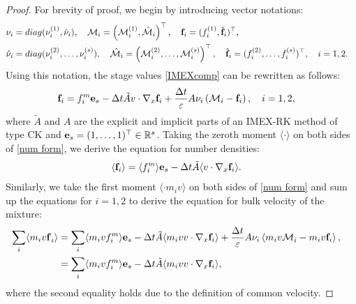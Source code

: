 \documentclass[10pt,reqno]{amsart}
\numberwithin{equation}{section}
\begin{document}
\begin{proof}
 For brevity of proof, we begin by introducing vector notations:
\begin{align*}
	&{\bf{\nu}}_i=diag(\nu_i^{(1)},\hat{\bf{\nu}}_i),\quad {\bf{\mathcal{M}}}_i=\left(\mathcal{M}_i^{(1)},\hat{\bf{\mathcal{M}}}_i\right)^\top,\quad{\bf{f}}_i=(f_i^{(1)},\hat{\bf{f}}_i)^\top,\cr
	&\hat{\bf{\nu}}_i=diag(\nu_i^{(2)},\dots,\nu_i^{(s)}),\quad \hat{\bf{\mathcal{M}}}_i=\left(\mathcal{M}_i^{(2)},\dots,\mathcal{M}_i^{(s)}\right)^\top,\quad\hat{\bf{f}}_i=(f_i^{(2)},\dots,f_i^{(s)})^\top,\quad i=1,2.
\end{align*}
Using this notation, the stage values \eqref{IMEXcomp} can be rewritten as follows:
\begin{align}\label{num form}
	\begin{split}
		{\bf{f}}_i &= f_i^{m}{\textbf{e}_{s}} - \Delta t \tilde{A} v \cdot \nabla_x {\bf{f}}_i + \frac{\Delta t}{\varepsilon}A{{\bf {\nu}}}_i\left({\bf{\mathcal{M}}}_i - {\bf{f}}_i\right), \quad i=1,2,
	\end{split}
\end{align}
where $\tilde{A}$ and $A$ are the explicit and implicit parts of an IMEX-RK method of type CK and ${\bf{e}}_{s}=(1,\dots,1)^\top \in \mathbb{R}^{s}$. 
Taking the zeroth moment $\langle \cdot \rangle$ on both sides of \eqref{num form}, we derive the equation for number densities:
\begin{align}\label{num n form}
	\begin{split}
		\langle{\bf{f}}_i \rangle &= 	\langle f_i^{m}\rangle {\textbf{e}_{s}} - \Delta t \tilde{A} 	\langle v \cdot \nabla_x {\bf{f}}_i \rangle.
	\end{split}
\end{align}
Similarly, we take the first moment $\langle \cdot m_i v \rangle$ on both sides of \eqref{num form} and sum up the equations for $i=1,2$ to derive the equation for bulk velocity of the mixture:
\begin{align}\label{num u form}
	\begin{split}
		\sum_i \langle{m_i v\bf{f}}_i \rangle &= \sum_i \langle m_i  vf_i^{m}\rangle{\textbf{e}_{s}} - \Delta t \tilde{A} \langle m_i vv \cdot \nabla_x {\bf{f}}_i \rangle + \frac{\Delta t}{\varepsilon}A{{\bf {\nu}}}_i\left\langle {m_i v\bf{\mathcal{M}}}_i -m_iv {\bf{f}}_i\right\rangle,\cr
		&= \sum_i \langle m_i  vf_i^{m}\rangle{\textbf{e}_{s}} - \Delta t \tilde{A} \langle m_i vv \cdot \nabla_x {\bf{f}}_i \rangle,
	\end{split}
\end{align}
where the second equality holds due to the definition of common velocity.


\end{proof}
\end{document}

